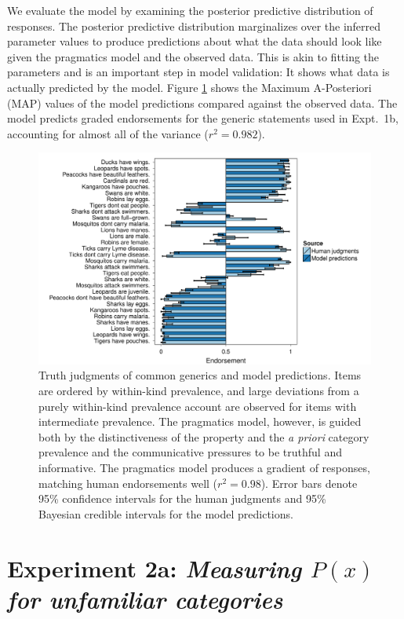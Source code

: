 \documentclass[10pt,letterpaper]{article}
\begin{document}
We evaluate the model by examining the posterior predictive distribution of responses. 
The posterior predictive distribution marginalizes over the inferred parameter values to produce predictions about what the data should look like given the pragmatics model and the observed data. 
This is akin to fitting the parameters and is an important step in model validation: It shows what data is actually predicted by the model. 
Figure \ref{fig:tj1b} shows the Maximum A-Posteriori (MAP) values of the model predictions compared against the observed data. 
The model predicts graded endorsements for the generic statements used in Expt.~1b, accounting for almost all of the variance ($r^2 = 0.982$). 

\begin{figure}
\centering
    \includegraphics[width=\columnwidth]{tj_n100-postPred-byItem.pdf}
    \caption{Truth judgments of common generics and model predictions. 
Items are ordered by within-kind prevalence, and large deviations from a purely within-kind prevalence account are observed for items with intermediate prevalence. 
The pragmatics model, however, is guided both by the distinctiveness of the property and the \emph{a priori} category prevalence and the communicative pressures to be truthful and informative.
The pragmatics model produces a gradient of responses, matching human endorsements well ($r^2 = 0.98$).
Error bars denote 95\% confidence intervals for the human judgments and 95\% Bayesian credible intervals for the model predictions.}
  \label{fig:tj1b}
\end{figure}


\section{Experiment 2a: \emph{Measuring $P(x)$ for unfamiliar categories}}
\end{document}
